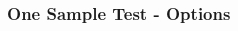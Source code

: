 \documentclass[xcolor={table},c]{beamer}
\begin{document}
\begin{frame}\frametitle{One Sample Test - Options}
\begin{columns}
\begin{column}{0.4\textwidth}
\begin{minipage}[c][4cm][c]{3.4cm}
\end{minipage}
\begin{minipage}[c][4cm][c]{3.4cm}
\end{minipage}
\end{column}
\begin{column}{0.6\textwidth}
\begin{minipage}[c][4cm][c]{6cm}

\end{minipage}
\begin{minipage}[c][4cm][c]{6cm}

\end{minipage}
\end{column}
\end{columns} 
\end{frame}
\end{document}
